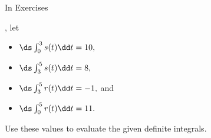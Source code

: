 \begin{exerciseset}{In Exercises}{, let
\begin{itemize}
\item $\ds \int_0^3 s(t)\dd t = 10,$
\item $\ds \int_3^5 s(t)\dd t=8,$
\item $\ds \int_3^5 r(t)\dd t = -1,$ and
\item $\ds \int_0^5 r(t)\dd t = 11.$
\end{itemize}
Use these values to evaluate the given definite integrals.}





\end{exerciseset}
